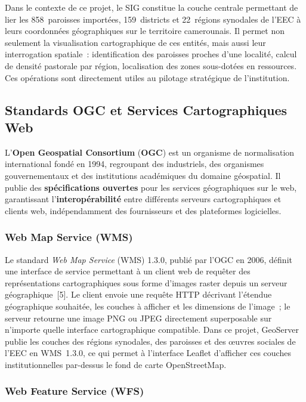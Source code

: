 \documentclass[12pt, a4paper]{report}
\newcommand{\kw}[1]{\textbf{#1}}
\begin{document}
Dans le contexte de ce projet, le SIG constitue la couche centrale permettant de
lier les 858~paroisses importées, 159~districts et 22~régions synodales de l'EEC
à leurs coordonnées géographiques sur le territoire camerounais. Il permet non seulement
la visualisation cartographique de ces entités, mais aussi leur interrogation
spatiale~: identification des paroisses proches d'une localité, calcul de densité
pastorale par région, localisation des zones sous-dotées en ressources. Ces
opérations sont directement utiles au pilotage stratégique de l'institution.

\subsection{Standards OGC et Services Cartographiques Web}

L'\kw{Open Geospatial Consortium} (\kw{OGC}) est un organisme de normalisation
international fondé en 1994, regroupant des industriels, des organismes
gouvernementaux et des institutions académiques du domaine géospatial. Il
publie des \textbf{spécifications ouvertes} pour les services géographiques sur
le web, garantissant l'\textbf{interopérabilité} entre différents serveurs
cartographiques et clients web, indépendamment des fournisseurs et des
plateformes logicielles.

\subsubsection{Web Map Service (WMS)}

Le standard \textit{Web Map Service} (WMS) 1.3.0, publié par l'OGC en 2006,
définit une interface de service permettant à un client web de requêter des
représentations cartographiques sous forme d'images raster depuis un serveur
géographique~[5]. Le client envoie une requête HTTP décrivant
l'étendue géographique souhaitée, les couches à afficher et les dimensions de
l'image~; le serveur retourne une image PNG ou JPEG directement superposable sur
n'importe quelle interface cartographique compatible. Dans ce projet, GeoServer
publie les couches des régions synodales, des paroisses et des œuvres sociales de
l'EEC en WMS~1.3.0, ce qui permet à l'interface Leaflet d'afficher ces couches
institutionnelles par-dessus le fond de carte OpenStreetMap.

\subsubsection{Web Feature Service (WFS)}
\end{document}
